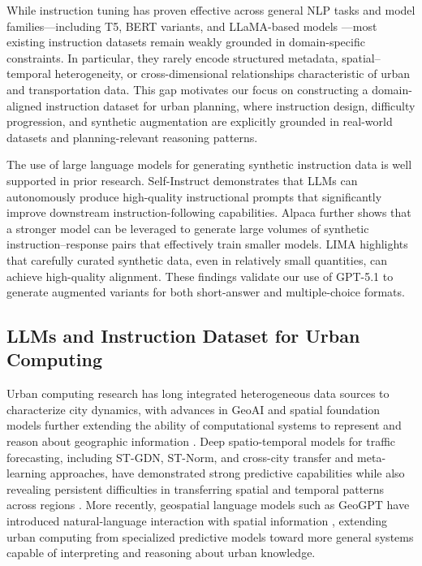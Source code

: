 \documentclass[a4paper,fleqn]{cas-sc}
\begin{document}
While instruction tuning has proven effective across general NLP tasks and model families—including T5, BERT variants, and LLaMA-based models \cite{wei2022finetuned}—most existing instruction datasets remain weakly grounded in domain-specific constraints. In particular, they rarely encode structured metadata, spatial–temporal heterogeneity, or cross-dimensional relationships characteristic of urban and transportation data. This gap motivates our focus on constructing a domain-aligned instruction dataset for urban planning, where instruction design, difficulty progression, and synthetic augmentation are explicitly grounded in real-world datasets and planning-relevant reasoning patterns.

The use of large language models for generating synthetic instruction data is well supported in prior research. Self-Instruct \cite{wang2023selfinstruct} demonstrates that LLMs can autonomously produce high-quality instructional prompts that significantly improve downstream instruction-following capabilities. Alpaca \cite{taori2023alpaca} further shows that a stronger model can be leveraged to generate large volumes of synthetic instruction–response pairs that effectively train smaller models. LIMA \cite{zhou2023lima} highlights that carefully curated synthetic data, even in relatively small quantities, can achieve high-quality alignment. These findings validate our use of GPT\mbox{-}5.1 to generate augmented variants for both short-answer and multiple-choice formats.

\subsection{LLMs and Instruction Dataset for Urban Computing}

Urban computing research has long integrated heterogeneous data sources to characterize city dynamics, with advances in GeoAI and spatial foundation models further extending the ability of computational systems to represent and reason about geographic information \cite{zheng2014urban,zheng2016urban,batty2013new,wang2024spatial,huang2022geoai}. Deep spatio-temporal models for traffic forecasting, including ST-GDN, ST-Norm, and cross-city transfer and meta-learning approaches, have demonstrated strong predictive capabilities while also revealing persistent difficulties in transferring spatial and temporal patterns across regions \cite{wang2020traffic,deng2021st,pan2019urban,zhang2020metast,lee2020crosscitytransfer}. More recently, geospatial language models such as GeoGPT have introduced natural-language interaction with spatial information \cite{gao2024geogpt}, extending urban computing from specialized predictive models toward more general systems capable of interpreting and reasoning about urban knowledge.
\end{document}
